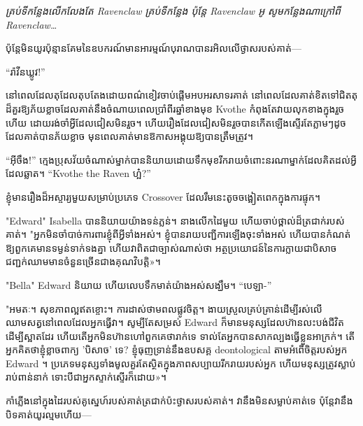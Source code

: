 \emph{គ្រប់ទីកន្លែងលើកលែងតែ Ravenclaw គ្រប់ទីកន្លែង ប៉ុន្តែ Ravenclaw អូ សូមកន្លែងណាក្រៅពី Ravenclaw…}

ប៉ុន្តែ​មិន​យូរ​ប៉ុន្មាន​គែម​នៃ​ឧបករណ៍​មាន​អារម្មណ៍​បុរាណ​បាន​រអិល​លើ​ថ្ងាស​របស់​គាត់—

“រ៉ាវីនឃ្លូវ!”

នៅពេលដែលតុដែលតុបតែងដោយពណ៌ខៀវចាប់ផ្តើមអបអរសាទរគាត់ នៅពេលដែលគាត់ខិតទៅជិតតុដ៏គួរឱ្យភ័យខ្លាចដែលគាត់នឹងចំណាយពេលប្រាំពីរឆ្នាំខាងមុខ Kvothe កំពុងតែវាយលុកខាងក្នុងរួចហើយ ដោយរង់ចាំអ្វីដែលជៀសមិនរួច។ ហើយរឿងដែលជៀសមិនរួចបានកើតឡើងស្ទើរតែភ្លាមៗដូចដែលគាត់បានភ័យខ្លាច មុនពេលគាត់មានឱកាសអង្គុយឱ្យបានត្រឹមត្រូវ។

“អ៊ីចឹង!” ក្មេងប្រុសវ័យចំណាស់ម្នាក់បាននិយាយដោយទឹកមុខរីករាយចំពោះនរណាម្នាក់ដែលគិតដល់អ្វីដែលឆ្លាត។ “Kvothe the Raven ហ្អ៎?”


ខ្ញុំមានរឿងដ៏អស្ចារ្យមួយសម្រាប់ប្រភេទ Crossover ដែលរឹមនេះតូចចង្អៀតពេកក្នុងការផ្ទុក។


"Edward" Isabella បាននិយាយយ៉ាងទន់ភ្លន់។ នាង​លើក​ដៃ​មួយ ហើយ​ចាប់​ថ្ពាល់​ដ៏​ត្រជាក់​របស់​គាត់។ "អ្នកមិនចាំបាច់ការពារខ្ញុំពីអ្វីទាំងអស់។ ខ្ញុំ​បាន​រាយ​បញ្ជី​ការ​ឡើង​ចុះ​ទាំង​អស់ ហើយ​បាន​កំណត់​ឱ្យ​ពួក​គេ​មាន​ទម្ងន់​ទាក់ទង​គ្នា ហើយ​វា​ពិត​ជា​ច្បាស់​ណាស់​ថា អត្ថប្រយោជន៍​នៃ​ការ​ក្លាយ​ជា​បិសាច​ជញ្ជក់​ឈាម​មាន​ចំនួន​ច្រើន​ជាង​គុណវិបត្តិ»។

"Bella" Edward និយាយ ហើយលេបទឹកមាត់យ៉ាងអស់សង្ឃឹម។ “បេឡា-”

"អមតៈ។ សុខភាពល្អឥតខ្ចោះ។ ការដាស់ថាមពលផ្លូវចិត្ត។ ងាយស្រួលគ្រប់គ្រាន់ដើម្បីរស់លើឈាមសត្វនៅពេលដែលអ្នកធ្វើវា។ សូម្បីតែសម្រស់ Edward ក៏មានមនុស្សដែលហ៊ានលះបង់ជីវិតដើម្បីស្អាតដែរ ហើយតើអ្នកមិនហ៊ានហៅពួកគេថារាក់ទេ ទាល់តែអ្នកបានសាកល្បងធ្វើខ្លួនអាក្រក់។ តើអ្នកគិតថាខ្ញុំខ្លាចពាក្យ 'បិសាច' ទេ? ខ្ញុំធុញទ្រាន់នឹងឧបសគ្គ deontological តាមអំពើចិត្តរបស់អ្នក Edward ។ ប្រភេទ​មនុស្ស​ទាំង​មូល​គួរ​តែ​ស្ថិត​ក្នុង​ភាព​សប្បាយ​រីក​រាយ​របស់​អ្នក ហើយ​មនុស្ស​ត្រូវ​ស្លាប់​រាប់​ពាន់​នាក់ ទោះ​បី​ជា​អ្នក​ស្ទាក់​ស្ទើរ​ក៏​ដោយ»។

កាំភ្លើងនៅក្នុងដៃរបស់គូស្នេហ៍របស់គាត់ត្រជាក់ប៉ះថ្ងាសរបស់គាត់។ វា​នឹង​មិន​សម្លាប់​គាត់​ទេ ប៉ុន្តែ​វា​នឹង​បិទ​គាត់​យូរ​ល្មម​ហើយ—


